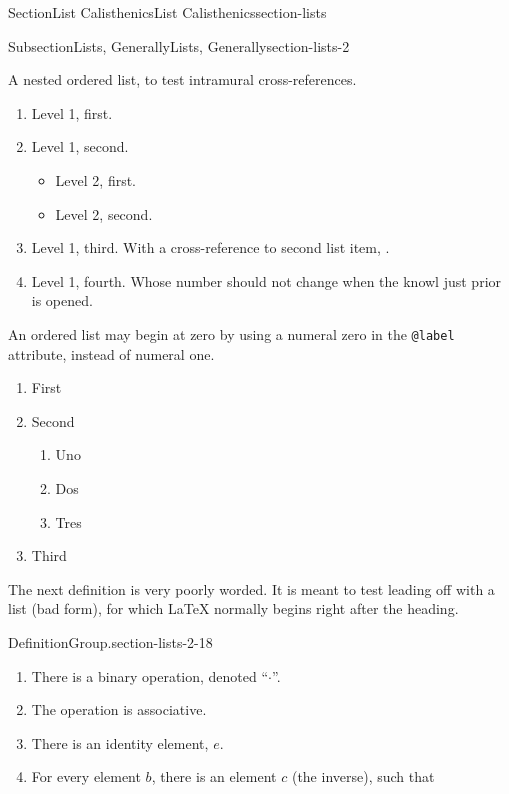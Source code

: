 \documentclass[twoside,10pt,]{article}
\newcommand{\xreffont}{\relax}
\newcommand{\mono}[1]{\texttt{#1}}
\numberwithin{equation}{section}
\begin{document}
\begin{sectionptx}{Section}{List Calisthenics}{}{List Calisthenics}{}{}{section-lists}
\begin{subsectionptx}{Subsection}{Lists, Generally}{}{Lists, Generally}{}{}{section-lists-2}
\begin{itemize}[label=$\blacksquare$]
\end{itemize}
%
\par
A nested ordered list, to test intramural cross-references.%
\begin{enumerate}
\item{}Level 1, first.%
\item\hypertarget{list-item-second}{}Level 1, second.%
\begin{itemize}[label=]
\item{}Level 2, first.%
\item{}Level 2, second.%
\end{itemize}
%
\item{}Level 1, third.  With a cross-reference to second list item, \hyperlink{list-item-second}{{\xreffont 2}}.%
\item{}Level 1, fourth.  Whose number should not change when the knowl just prior is opened.%
\end{enumerate}
%
\par
An ordered list may begin at zero by using a numeral zero in the \mono{@label} attribute, instead of numeral one.%
\begin{enumerate}[label={(\arabic*), start=0}]
\item{}First%
\item{}Second%
\begin{enumerate}[label={-\arabic*-, start=0}]
\item{}Uno%
\item{}Dos%
\item{}Tres%
\end{enumerate}
%
\item{}Third%
\end{enumerate}
%
\par
The next definition is very poorly worded.  It is meant to test leading off with a list (bad form), for which \LaTeX{} normally begins right after the heading.%
\begin{definition}{Definition}{Group.}{section-lists-2-18}%
%
%
\begin{enumerate}[label={\alph*)}]
\item{}There is a binary operation, denoted ``\(\cdot\)''.%
\item{}The operation is associative.%
\item{}There is an identity element, \(e\).%
\item{}For every element \(b\), there is an element \(c\) (the inverse), such that%
\begin{equation*}

\end{equation*}
\end{enumerate}
\end{definition}
\end{subsectionptx}
\end{sectionptx}
\end{document}
